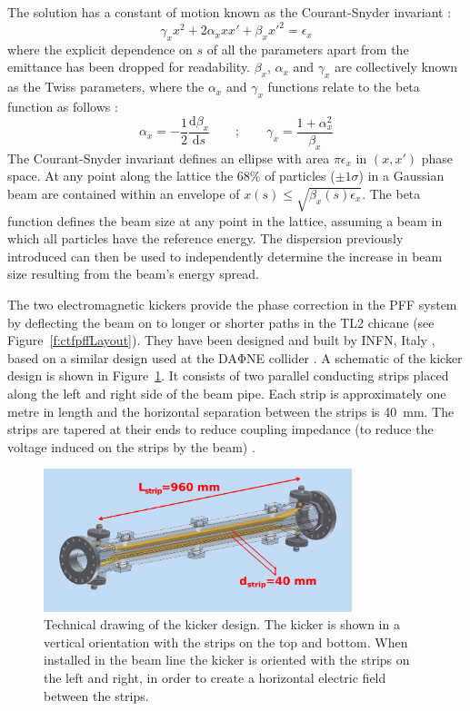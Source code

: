 The solution has a constant of motion known as the Courant-Snyder invariant \cite{courant}:
\begin{equation}
\gamma_x x^2 + 2\alpha_x x x' + \beta_x x'^2 = \epsilon_x 
\end{equation}
where the explicit dependence on \(s\) of all the parameters apart from the emittance has been dropped for readability. \(\beta_{x}\), \(\alpha_{x}\) and \(\gamma_{x}\) are collectively known as the Twiss parameters, where the \(\alpha_x\) and \(\gamma_x\) functions relate to the beta function as follows \cite{wilson}:
\begin{equation}
\alpha_x = -\frac{1}{2}\frac{\mathrm{d}\beta_x}{\mathrm{d}s}
\qquad\mathrm{;}\qquad
\gamma_x = \frac{1+\alpha_x^2}{\beta_x}
\label{e:twissEqAlpha}
\end{equation}
The Courant-Snyder invariant defines an ellipse with area \(\pi\epsilon_x\) in \((x, x')\) phase space. At any point along the lattice the 68\% of particles (\(\pm 1\sigma\)) in a Gaussian beam are contained within an envelope of \(x(s) \leq \sqrt{\beta_x(s)\epsilon_x}\). The beta function defines the beam size at any point in the lattice, assuming a beam in which all particles have the reference energy. The dispersion previously introduced can then be used to independently determine the increase in beam size resulting from the beam's energy spread.


The two electromagnetic kickers provide the phase correction in the PFF system by deflecting the beam on to longer or shorter paths in the TL2 chicane (see Figure~\ref{f:ctfpffLayout}). They have been designed and built by INFN, Italy \cite{infn}, based on a similar design used at the DA\(\mathrm{\Phi}\)NE collider \cite{dafneKick}. A schematic of the kicker design is shown in Figure~\ref{f:kickerSchematic}. It consists of two parallel conducting strips placed along the left and right side of the beam pipe. Each strip is approximately one metre in length and the horizontal separation between the strips is 40~mm. The strips are tapered at their ends to reduce coupling impedance (to reduce the voltage induced on the strips by the beam) \cite{kickerIPAC11}.

\begin{figure}
  \centering
  \includegraphics[width=0.8\textwidth]{Figures/optics/kickerSchematic}
  \caption{Technical drawing of the kicker design. The kicker is shown in a vertical orientation with the strips on the top and bottom. When installed in the beam line the kicker is oriented with the strips on the left and right, in order to create a horizontal electric field between the strips.}
  \label{f:kickerSchematic}
\end{figure}

